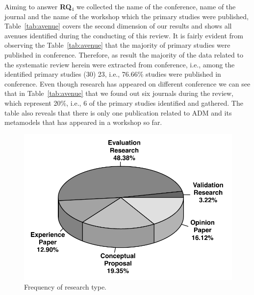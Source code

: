  Aiming to answer \textbf{RQ$_4$} we collected the name of the conference, name of the journal and the name of the workshop which the primary studies were published, Table~\ref{tab:avenue} covers the second dimension of our results and shows all avenues identified during the conducting of this review. It is fairly evident from observing the Table~\ref{tab:avenue} that the majority of primary studies were published in conference. Therefore, as result the majority of the data related to the systematic review herein were extracted from conference, i.e., among the identified primary studies (30) 23, i.e., 76.66\% studies were published in conference. Even though research has appeared on different conference we can see that in Table~\ref{tab:avenue} that we found out six journals during the review, which represent 20\%, i.e., 6 of the primary studies identified and gathered. The table also reveals that there is only one publication related to ADM and its metamodels that has appeared in a workshop so far.



 \begin{figure}[!h]
 \centering
   \includegraphics[scale=0.45]{figuras/pieEvaluation}
 \caption{Frequency of research type.}
 \label{fig:pieEvaluation}
\end{figure} 




